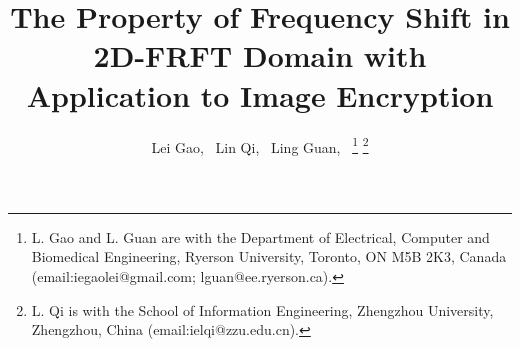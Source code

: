 \documentclass[journal]{IEEEtran}
\begin{document}
%
\title{The Property of Frequency Shift in 2D-FRFT Domain with Application to Image Encryption}
%

\author{Lei Gao,~
        Lin Qi,~
        Ling Guan,~%
\thanks{L. Gao and L. Guan are with the Department of Electrical, Computer and Biomedical Engineering, Ryerson University, Toronto, ON M5B 2K3, Canada (email:iegaolei@gmail.com; lguan@ee.ryerson.ca).}%
\thanks{L. Qi is with the School of Information Engineering, Zhengzhou University, Zhengzhou, China (email:ielqi@zzu.edu.cn).}}

%
%
\end{document}

